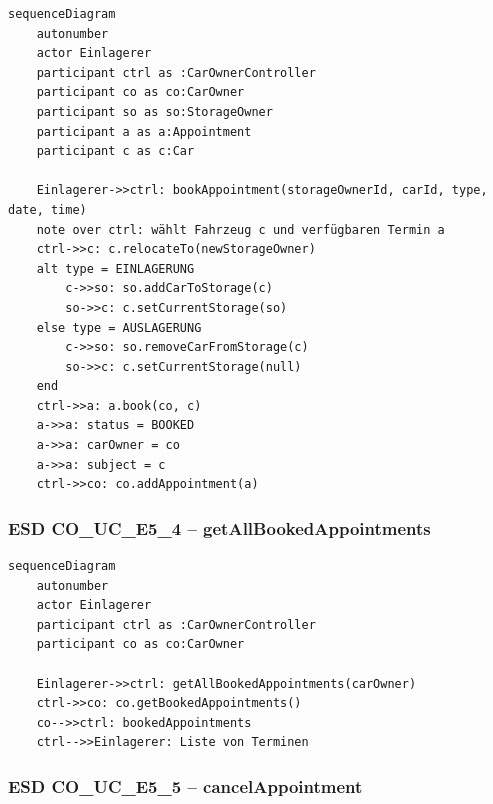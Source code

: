 \begin{lstlisting}[basicstyle=\ttfamily\small, breaklines=true]
sequenceDiagram
    autonumber
    actor Einlagerer
    participant ctrl as :CarOwnerController
    participant co as co:CarOwner
    participant so as so:StorageOwner
    participant a as a:Appointment
    participant c as c:Car

    Einlagerer->>ctrl: bookAppointment(storageOwnerId, carId, type, date, time)
    note over ctrl: wählt Fahrzeug c und verfügbaren Termin a
    ctrl->>c: c.relocateTo(newStorageOwner)
    alt type = EINLAGERUNG
        c->>so: so.addCarToStorage(c)
        so->>c: c.setCurrentStorage(so)
    else type = AUSLAGERUNG
        c->>so: so.removeCarFromStorage(c)
        so->>c: c.setCurrentStorage(null)
    end
    ctrl->>a: a.book(co, c)
    a->>a: status = BOOKED
    a->>a: carOwner = co
    a->>a: subject = c
    ctrl->>co: co.addAppointment(a)
\end{lstlisting}

\newpage

{}
\subsubsection*{ESD CO\_UC\_E5\_4 – getAllBookedAppointments}

\begin{lstlisting}[basicstyle=\ttfamily\small, breaklines=true]
sequenceDiagram
    autonumber
    actor Einlagerer
    participant ctrl as :CarOwnerController
    participant co as co:CarOwner

    Einlagerer->>ctrl: getAllBookedAppointments(carOwner)
    ctrl->>co: co.getBookedAppointments()
    co-->>ctrl: bookedAppointments
    ctrl-->>Einlagerer: Liste von Terminen
\end{lstlisting}

\newpage

{}
\subsubsection*{ESD CO\_UC\_E5\_5 – cancelAppointment}

